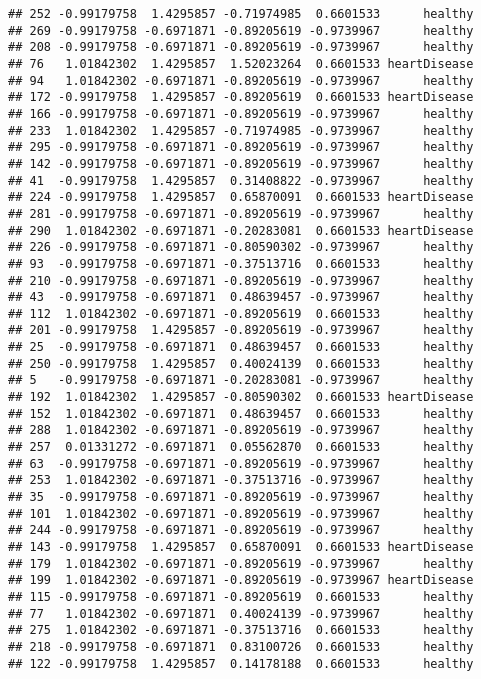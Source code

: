 \documentclass[
]{article}
\begin{document}
\begin{verbatim}
## 252 -0.99179758  1.4295857 -0.71974985  0.6601533      healthy
## 269 -0.99179758 -0.6971871 -0.89205619 -0.9739967      healthy
## 208 -0.99179758 -0.6971871 -0.89205619 -0.9739967      healthy
## 76   1.01842302  1.4295857  1.52023264  0.6601533 heartDisease
## 94   1.01842302 -0.6971871 -0.89205619 -0.9739967      healthy
## 172 -0.99179758  1.4295857 -0.89205619  0.6601533 heartDisease
## 166 -0.99179758 -0.6971871 -0.89205619 -0.9739967      healthy
## 233  1.01842302  1.4295857 -0.71974985 -0.9739967      healthy
## 295 -0.99179758 -0.6971871 -0.89205619 -0.9739967      healthy
## 142 -0.99179758 -0.6971871 -0.89205619 -0.9739967      healthy
## 41  -0.99179758  1.4295857  0.31408822 -0.9739967      healthy
## 224 -0.99179758  1.4295857  0.65870091  0.6601533 heartDisease
## 281 -0.99179758 -0.6971871 -0.89205619 -0.9739967      healthy
## 290  1.01842302 -0.6971871 -0.20283081  0.6601533 heartDisease
## 226 -0.99179758 -0.6971871 -0.80590302 -0.9739967      healthy
## 93  -0.99179758 -0.6971871 -0.37513716  0.6601533      healthy
## 210 -0.99179758 -0.6971871 -0.89205619 -0.9739967      healthy
## 43  -0.99179758 -0.6971871  0.48639457 -0.9739967      healthy
## 112  1.01842302 -0.6971871 -0.89205619  0.6601533      healthy
## 201 -0.99179758  1.4295857 -0.89205619 -0.9739967      healthy
## 25  -0.99179758 -0.6971871  0.48639457  0.6601533      healthy
## 250 -0.99179758  1.4295857  0.40024139  0.6601533      healthy
## 5   -0.99179758 -0.6971871 -0.20283081 -0.9739967      healthy
## 192  1.01842302  1.4295857 -0.80590302  0.6601533 heartDisease
## 152  1.01842302 -0.6971871  0.48639457  0.6601533      healthy
## 288  1.01842302 -0.6971871 -0.89205619 -0.9739967      healthy
## 257  0.01331272 -0.6971871  0.05562870  0.6601533      healthy
## 63  -0.99179758 -0.6971871 -0.89205619 -0.9739967      healthy
## 253  1.01842302 -0.6971871 -0.37513716 -0.9739967      healthy
## 35  -0.99179758 -0.6971871 -0.89205619 -0.9739967      healthy
## 101  1.01842302 -0.6971871 -0.89205619 -0.9739967      healthy
## 244 -0.99179758 -0.6971871 -0.89205619 -0.9739967      healthy
## 143 -0.99179758  1.4295857  0.65870091  0.6601533 heartDisease
## 179  1.01842302 -0.6971871 -0.89205619 -0.9739967      healthy
## 199  1.01842302 -0.6971871 -0.89205619 -0.9739967 heartDisease
## 115 -0.99179758 -0.6971871 -0.89205619  0.6601533      healthy
## 77   1.01842302 -0.6971871  0.40024139 -0.9739967      healthy
## 275  1.01842302 -0.6971871 -0.37513716  0.6601533      healthy
## 218 -0.99179758 -0.6971871  0.83100726  0.6601533      healthy
## 122 -0.99179758  1.4295857  0.14178188  0.6601533      healthy

\end{verbatim}
\end{document}
